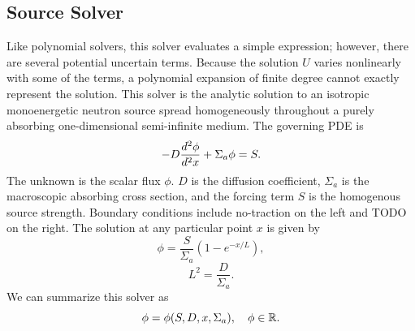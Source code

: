 \subsection{Source Solver}
Like polynomial solvers, this solver evaluates a simple expression; however, there are several potential uncertain terms.  Because the solution $U$ varies nonlinearly with some of the terms, a polynomial expansion of finite degree cannot exactly represent the solution.  This solver is the analytic solution to an isotropic monoenergetic neutron source spread homogeneously throughout a purely absorbing one-dimensional semi-infinite medium.  The governing PDE is
\begin{equation}
-D\frac{d^2 \phi}{d^2 x}+\Sigma_a\phi = S.
\end{equation}
The unknown is the scalar flux $\phi$.  $D$ is the diffusion coefficient, $\Sigma_a$ is the macroscopic absorbing cross section, and the forcing term $S$ is the homogenous source strength.  Boundary conditions include no-traction on the left and TODO on the right.  The solution at any particular point $x$ is given by
\begin{equation}
\phi=\frac{S}{\Sigma_a}\left(1-e^{-x/L}\right),
\end{equation}
\begin{equation}
L^2= \frac{D}{\Sigma_a}.
\end{equation}
We can summarize this solver as
\begin{equation}
\phi=\phi\qty(S,D,x,\Sigma_a),\hspace{10pt}\phi\in\mathbb{R}.
\end{equation}

